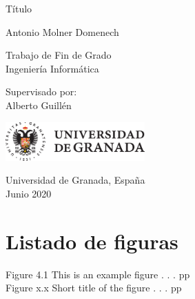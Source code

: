 \documentclass[
  12pt,
  a4paperpaper,
]{report}
\author{}
\date{}
\begin{document}
\begin{titlepage}
    \begin{center}

        
        \vspace*{2.5cm}
        
        \huge
        Título
        
        \vspace{1.5cm}
        
        \Large
        Antonio Molner Domenech

        \vspace{1.5cm}

        \normalsize
        Trabajo de Fin de Grado\\
        Ingeniería Informática
        
        \vfill
        
        \normalsize
        Supervisado por:\\
        Alberto Guillén

        \vspace{0.8cm}

        \includegraphics[width=0.4\textwidth]{style/univ_logo.eps}
        
        \normalsize
        Universidad de Granada, España\\
        Junio 2020


    \end{center}
\end{titlepage}


\tableofcontents

\newpage

\hypertarget{listado-de-figuras}{%
\chapter*{Listado de figuras}\label{listado-de-figuras}}

Figure 4.1 This is an example figure . . . \hfill{pp}\\
Figure x.x Short title of the figure . . . \hfill{pp}

\setcounter{page}{3}

\newpage
\end{document}
